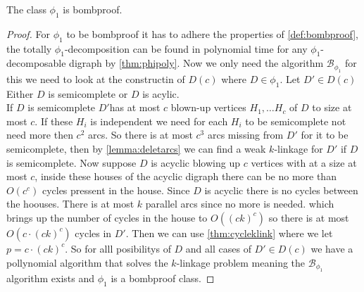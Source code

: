 \begin{thm}
    The class $\phi_1$ is bombproof.
    \label{thm:phi1bomb}
\end{thm}
\begin{proof}
    For $\phi_1$ to be bombproof it has to adhere the properties of \autoref{def:bombproof}, the totally $\phi_1$-decomposition can be found in polynomial time for any $\phi_1$-decomposable digraph by \autoref{thm:phipoly}.
    Now we only need the algorithm $\mathcal{B}_{\phi_1}$ for this we need to look at the constructin of $D(c)$ where $D\in \phi_1$.
    Let $D'\in D(c)$ Either $D$ is semicomplete or $D$ is acylic.\\
    If $D$ is semicomplete $D'$has at most $c$ blown-up vertices $H_1,\dots H_c$ of $D$ to size at most $c$.
    If these $H_i$ is independent we need for each $H_i$ to be semicomplete not need more then $c^2$ arcs. 
    So there is at most $c^3$ arcs missing from $D'$ for it to be semicomplete, then by \autoref{lemma:deletarcs} we can find a weak $k$-linkage for $D'$ if $D$ is semicomplete.
    Now suppose $D$ is acyclic blowing up $c$ vertices with at a size at most $c$, inside these houses of the acyclic digraph there can be no more than $O(c^c)$ cycles pressent in the house.
    Since $D$ is acyclic there is no cycles between the hoouses. 
    There is at most $k$ parallel arcs since no more is needed. which brings up the number of cycles in the house to $O((ck)^c)$ so there is at most $O(c\cdot (ck)^c)$ cycles in $D'$. 
    Then we can use \autoref{thm:cycleklink} where we let $p=c\cdot (ck)^c$.
    So for alll posibilitys of $D$ and all cases of $D'\in D(c)$ we have a pollynomial algorithm that solves the $k$-linkage problem meaning the $\mathcal{B}_{\phi_1}$ algorithm exists and $\phi_1$ is a bombproof class.
\end{proof}

